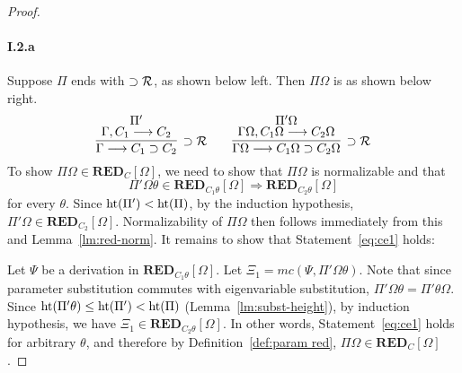\documentclass[preprint]{elsarticle}
\newcommand{\Seq}[2]{#1\longrightarrow #2}
\newcommand{\measure}[1]{{\rm ht}(#1)}
\newcommand{\oimpR}{\oimp{\cal R}}
\newcommand{\oimp}{\supset}
\def\RED{{\mathbf{RED}}}
\begin{document}
\begin{proof}
\paragraph{\bf I.2.a} Suppose $\Pi$ ends with $\oimpR$, as shown below left.
Then $\Pi\Omega$ is as shown below right.
$$
\infer[\oimpR] {\Seq \Gamma {C_1 \oimp C_2}} { \deduce{\Seq {\Gamma,
      C_1}{C_2}}{\Pi'} }
\qquad
\infer[\oimpR] {\Seq {\Gamma\Omega} {C_1\Omega \oimp C_2\Omega}} {
  \deduce{\Seq {\Gamma\Omega, C_1\Omega}{C_2\Omega}}{\Pi'\Omega} }
$$
To show $\Pi\Omega \in \RED_C[\Omega]$, we need to show that
$\Pi\Omega$ is normalizable and that
\begin{equation}
  \label{eq:ce1}
  \Pi'\Omega\theta \in \RED_{C_1\theta}[\Omega] \Rightarrow \RED_{C_2\theta}[\Omega] 
\end{equation}
for every $\theta$.  Since $\measure{\Pi'} < \measure{\Pi}$, by the
induction hypothesis, $\Pi'\Omega \in \RED_{C_2}[\Omega]$.
Normalizability of $\Pi\Omega$ then follows immediately from this and
Lemma~\ref{lm:red-norm}. It remains to show that
Statement~\ref{eq:ce1} holds:

Let $\Psi$ be a derivation in $\RED_{C_1\theta}[\Omega]$.  Let $\Xi_1
= mc(\Psi, \Pi'\Omega\theta)$.  Note that since parameter substitution
commutes with eigenvariable substitution, $\Pi' \Omega \theta =
\Pi'\theta\Omega$.  Since $\measure{\Pi'\theta} \leq \measure{\Pi'} <
\measure{\Pi}$ (Lemma~\ref{lm:subst-height}), by induction hypothesis,
we have $\Xi_1 \in \RED_{C_2\theta}[\Omega]$.  In other words,
Statement~\ref{eq:ce1} holds for arbitrary $\theta$, and therefore by
Definition~\ref{def:param red}, $\Pi\Omega \in \RED_C[\Omega]$.


\end{proof}
\end{document}
